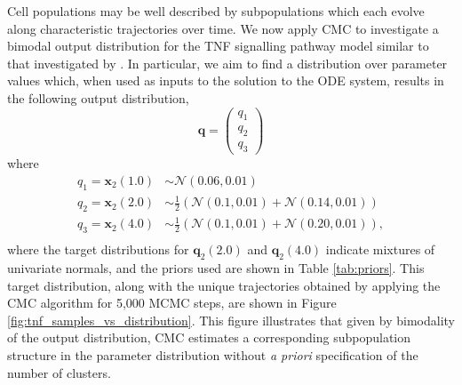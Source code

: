 Cell populations may be well described by subpopulations which each evolve along characteristic trajectories over time. We now apply CMC to investigate a bimodal output distribution for the TNF signalling pathway model similar to that investigated by \cite{hasenauer2011identification}. In particular, we aim to find a distribution over parameter values which, when used as inputs to the solution to the ODE system, results in the following output distribution,
%
\begin{equation}
\boldsymbol{q} = \begin{pmatrix} q_1 \\ q_2 \\ q_3 \end{pmatrix}
\end{equation}
where
\begin{equation}
\begin{aligned}
q_1 = \boldsymbol{x}_2(1.0) &\sim \mathcal{N}(0.06, 0.01)\\
q_2 = \boldsymbol{x}_2(2.0) &\sim\frac{1}{2}\left(\mathcal{N}(0.1, 0.01) + \mathcal{N}(0.14, 0.01)\right)\\
q_3 = \boldsymbol{x}_2(4.0) &\sim\frac{1}{2}\left(\mathcal{N}(0.1, 0.01) + \mathcal{N}(0.20, 0.01)\right),\\
\end{aligned}
\end{equation}
%
where the target distributions for $\boldsymbol{q}_2(2.0)$ and $\boldsymbol{q}_2(4.0)$ indicate mixtures of univariate normals, and the priors used are shown in Table \ref{tab:priors}. This target distribution, along with the unique trajectories obtained by applying the CMC algorithm for 5,000 MCMC steps, are shown in Figure \ref{fig:tnf_samples_vs_distribution}. This figure illustrates that given by bimodality of the output distribution, CMC estimates a corresponding subpopulation structure in the parameter distribution without \textit{a priori} specification of the number of clusters.

